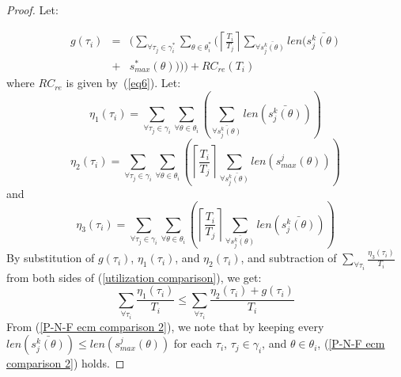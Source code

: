 \begin{proof}
Let:
%

\begin{eqnarray*}
g(\tau_{i}) & = & \Bigg(\sum_{\forall\tau_{j}\in\gamma_{i}^{*}}\sum_{\theta\in\theta_{i}^{*}}\Bigg(\left\lceil \frac{T_{i}}{T_{j}}\right\rceil \sum_{\forall\bar{s_{j}^{k}(\theta)}}len\Big(\bar{s_{j}^{k}(\theta)}\\
 & + & s_{max}^{*}(\theta)\Big)\Bigg)\Bigg)+RC_{re}(T_{i})
\end{eqnarray*}
%
where $RC_{re}$ is given by~(\ref{eq6}). Let:
%
\begin{equation*}
\eta_{1}(\tau_{i})=\sum_{\forall\tau_{j}\in\gamma_{i}}\sum_{\forall\theta\in\theta_{i}}\left(\sum_{\bar{\forall s_{j}^{k}(\theta)}}len\left(\bar{s_{j}^{k}(\theta)}\right)\right)
\end{equation*}
%
\begin{equation*}
\eta_{2}(\tau_{i})=\sum_{\forall\tau_{j}\in\gamma_{i}}\sum_{\forall\theta\in\theta_{i}}\left(\left\lceil \frac{T_{i}}{T_{j}}\right\rceil \sum_{\forall\bar{s_{j}^{k}(\theta)}}len\left(s_{max}^{j}(\theta)\right)\right)
\end{equation*}
%
and
%
\begin{equation*}
\eta_{3}(\tau_{i})=\sum_{\forall\tau_{j}\in\gamma_{i}}\sum_{\forall\theta\in\theta_{i}}\left(\left\lceil \frac{T_{i}}{T_{j}}\right\rceil \sum_{\bar{\forall s_{j}^{k}(\theta)}}len\left(\bar{s_{j}^{k}(\theta)}\right)\right)
\end{equation*}
%
By substitution of $g(\tau_{i})$, $\eta_1(\tau_i)$, and $\eta_2(\tau_i)$, and subtraction of $\sum_{\forall \tau_i} \frac{\eta_3(\tau_i)}{T_i}$ from both sides of (\ref{utilization comparison}), we get: 
\begin{equation}
\sum_{\forall \tau_i} \frac{\eta_1(\tau_i)}{T_i} \le \sum_{\forall \tau_i} \frac{\eta_2(\tau_i)+g(\tau_i)}{T_i}
\label{P-N-F ecm comparison 2}
\end{equation}
From (\ref{P-N-F ecm comparison 2}), we note that by keeping
every $len(\bar{s_{j}^{k}(\theta)})\le len(s_{max}^{j}(\theta))$
for each $\tau_{i}$, $\tau_{j}\in\gamma_{i}$, and $\theta\in\theta_{i}$,  (\ref{P-N-F ecm comparison 2}) holds. 

\end{proof}

